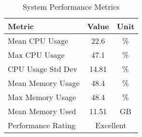 \begin{table}[htbp]
\centering
\caption{System Performance Metrics}
\label{tab:system_performance}
\begin{tabular}{|l|c|c|}
\hline
\textbf{Metric} & \textbf{Value} & \textbf{Unit} \\
\hline
Mean CPU Usage & 22.6 & \% \\
Max CPU Usage & 47.1 & \% \\
CPU Usage Std Dev & 14.81 & \% \\
\hline
Mean Memory Usage & 48.4 & \% \\
Max Memory Usage & 48.4 & \% \\
Mean Memory Used & 11.51 & GB \\
\hline
Performance Rating & \multicolumn{2}{c|}{Excellent} \\
\hline
\end{tabular}
\end{table}